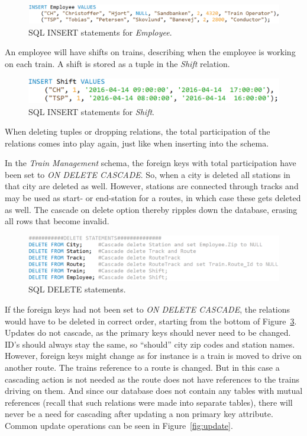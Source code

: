 \begin{figure}[h]
    \centering
    \includegraphics[scale=.5]{img/INSERT_Statements_Employee}
    \caption{SQL INSERT statements for \emph{Employee}.}
    \label{fig:ins:employee}
\end{figure}

An employee will have shifts on trains, describing when the employee is working 
on each train. A shift is stored as a tuple in the \emph{Shift} relation.

\begin{figure}[h]
    \centering
    \includegraphics[scale=.5]{img/INSERT_Statements_Shift}
    \caption{SQL INSERT statements for \emph{Shift}.}
    \label{fig:ins:shift}
\end{figure}

When deleting tuples or dropping relations, the total participation of the 
relations comes into play again, just like when inserting into the schema.

In the \emph{Train Management} schema, the foreign keys with total 
participation have been set to \emph{ON DELETE CASCADE}. So, when a city is 
deleted all stations in that city are deleted as well. However, stations are 
connected through tracks and may be used as start- or end-station for a routes, 
in which case these gets deleted as well. The cascade on delete option thereby 
ripples down the database, erasing all rows that become invalid.

\begin{figure}[h]
    \centering
    \includegraphics[scale=.5]{img/DELETE_Statements}
    \caption{SQL DELETE statements.}
    \label{fig:delete}
\end{figure}

If the foreign keys had not been set to \emph{ON DELETE CASCADE}, the relations 
would have to be deleted in correct order, starting from the bottom of 
Figure~\ref{fig:delete}.
Updates do not cascade, as the primary keys should never need to be changed. 
ID's should always stay the same, so ``should'' city zip codes and station 
names. However, foreign keys might change as for instance is a train is moved 
to drive on another route. The trains reference to a route is changed. But in 
this case a cascading action is not needed as the route does not have 
references to the trains driving on them. And since our database does not 
contain any tables with mutual references (recall that such relations were made 
into separate tables), there will never be a need for cascading after updating 
a non primary key attribute. Common update operations can be seen in 
Figure~\ref{fig:update}.

